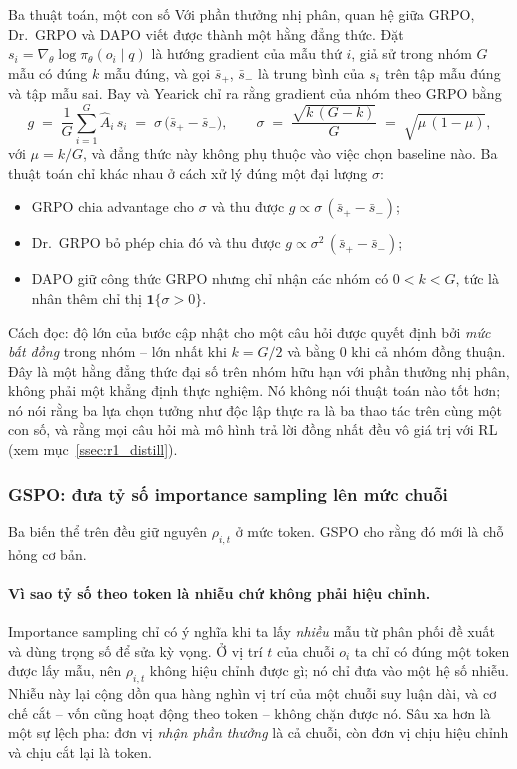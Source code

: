 \begin{deepdive}{Ba thuật toán, một con số}
Với phần thưởng nhị phân, quan hệ giữa GRPO, Dr.~GRPO và DAPO viết được thành một hằng đẳng thức. Đặt $s_i = \nabla_\theta \log \pi_\theta(o_i \mid q)$ là hướng gradient của mẫu thứ $i$, giả sử trong nhóm $G$ mẫu có đúng $k$ mẫu đúng, và gọi $\bar{s}_+$, $\bar{s}_-$ là trung bình của $s_i$ trên tập mẫu đúng và tập mẫu sai. Bay và Yearick \cite{bay2026stdidentity} chỉ ra rằng gradient của nhóm theo GRPO bằng
\[
g \;=\; \frac{1}{G}\sum_{i=1}^{G}\hat{A}_i\, s_i \;=\; \sigma\,\big(\bar{s}_+ - \bar{s}_-\big),
\qquad
\sigma \;=\; \frac{\sqrt{k\,(G-k)}}{G} \;=\; \sqrt{\mu\,(1-\mu)},
\]
với $\mu = k/G$, và đẳng thức này không phụ thuộc vào việc chọn baseline nào. Ba thuật toán chỉ khác nhau ở cách xử lý đúng một đại lượng $\sigma$:
\begin{itemize}
	\item GRPO chia advantage cho $\sigma$ và thu được $g \propto \sigma\,(\bar{s}_+ - \bar{s}_-)$;
	\item Dr.~GRPO bỏ phép chia đó và thu được $g \propto \sigma^2\,(\bar{s}_+ - \bar{s}_-)$;
	\item DAPO giữ công thức GRPO nhưng chỉ nhận các nhóm có $0 < k < G$, tức là nhân thêm chỉ thị $\mathbf{1}\{\sigma > 0\}$.
\end{itemize}
Cách đọc: độ lớn của bước cập nhật cho một câu hỏi được quyết định bởi \emph{mức bất đồng} trong nhóm -- lớn nhất khi $k = G/2$ và bằng 0 khi cả nhóm đồng thuận. Đây là một hằng đẳng thức đại số trên nhóm hữu hạn với phần thưởng nhị phân, không phải một khẳng định thực nghiệm. Nó không nói thuật toán nào tốt hơn; nó nói rằng ba lựa chọn tưởng như độc lập thực ra là ba thao tác trên cùng một con số, và rằng mọi câu hỏi mà mô hình trả lời đồng nhất đều vô giá trị với RL (xem mục~\ref{ssec:r1_distill}).
\end{deepdive}

\subsubsection{GSPO: đưa tỷ số importance sampling lên mức chuỗi}

Ba biến thể trên đều giữ nguyên $\rho_{i,t}$ ở mức token. GSPO \cite{zheng2025gspo} cho rằng đó mới là chỗ hỏng cơ bản.

\paragraph{Vì sao tỷ số theo token là nhiễu chứ không phải hiệu chỉnh.}
Importance sampling chỉ có ý nghĩa khi ta lấy \emph{nhiều} mẫu từ phân phối đề xuất và dùng trọng số để sửa kỳ vọng. Ở vị trí $t$ của chuỗi $o_i$ ta chỉ có đúng một token được lấy mẫu, nên $\rho_{i,t}$ không hiệu chỉnh được gì; nó chỉ đưa vào một hệ số nhiễu. Nhiễu này lại cộng dồn qua hàng nghìn vị trí của một chuỗi suy luận dài, và cơ chế cắt -- vốn cũng hoạt động theo token -- không chặn được nó. Sâu xa hơn là một sự lệch pha: đơn vị \emph{nhận phần thưởng} là cả chuỗi, còn đơn vị chịu hiệu chỉnh và chịu cắt lại là token.

